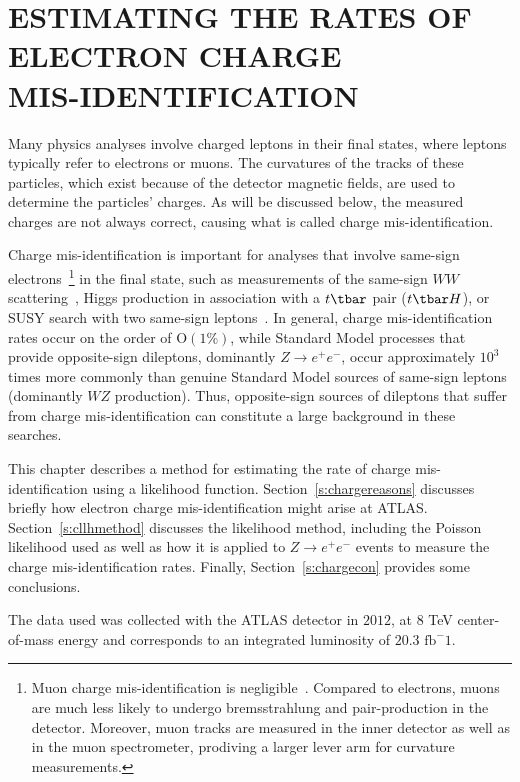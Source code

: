 
\chapter{ESTIMATING THE RATES OF ELECTRON CHARGE
  \\MIS-IDENTIFICATION}\label{c:cid}

Many physics analyses involve charged leptons in their final states, where
leptons typically refer to electrons or muons. The curvatures of the tracks of
these particles, which exist because of the detector magnetic fields, are used
to determine the particles' charges. As will be discussed below, the measured
charges are not always correct, causing what is called charge
mis-identification.

Charge mis-identification is important for analyses that involve same-sign
electrons~\footnote{Muon charge mis-identification is negligible~\cite{muonchargemid}.
	Compared to electrons, muons are much less likely to undergo bremsstrahlung and
	pair-production in the detector. Moreover, muon tracks are measured in the
	inner detector as well as in the muon spectrometer, prodiving a larger lever
	arm for curvature measurements.} in the final state, such as measurements of
the same-sign $WW$ scattering~\cite{sswwscatting}, Higgs production in
association with a $t\tbar$ pair ($t\tbar H$), or SUSY search with two
same-sign leptons~\cite{ssssleptons}. In general, charge mis-identification
rates occur on the order of $\text{O}(1\%)$, while Standard Model processes
that provide opposite-sign dileptons, dominantly $Z\to e^+e^-$, occur
approximately $10^3$ times more commonly than genuine Standard Model sources of
same-sign leptons (dominantly $WZ$ production). Thus, opposite-sign sources of
dileptons that suffer from charge mis-identification can constitute a large
background in these searches.


This chapter describes a method for estimating the rate of charge
mis-identification using a likelihood function. Section~\ref{s:chargereasons}
discusses briefly how electron charge mis-identification might arise at ATLAS.
Section~\ref{s:cllhmethod} discusses the likelihood method, including the
Poisson likelihood used as well as how it is applied to $Z\to e^+e^-$ events to
measure the charge mis-identification rates. Finally, Section~\ref{s:chargecon}
provides some conclusions.

The data used was collected with the ATLAS detector in $2012$, at $8$ TeV
center-of-mass energy and corresponds to an integrated luminosity of $20.3$
$\text{fb}^-1$.

